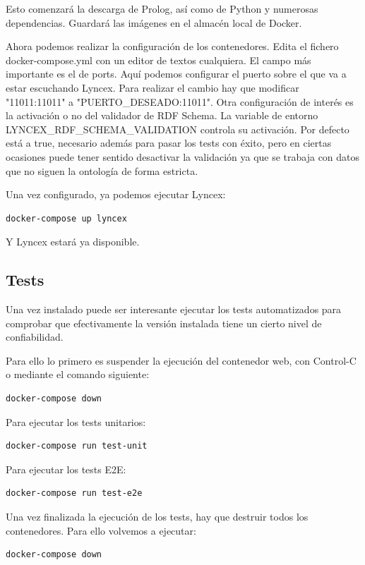 \documentclass[12pt]{report} %
\begin{document}
Esto comenzará la descarga de Prolog, así como de Python y numerosas dependencias. Guardará las imágenes en el almacén local de Docker. 

Ahora podemos realizar la configuración de los contenedores. Edita el fichero docker-compose.yml con un editor de textos cualquiera. El campo más importante es el de ports. Aquí podemos configurar el puerto sobre el que va a estar escuchando Lyncex. Para realizar el cambio hay que modificar "11011:11011" a "PUERTO\_DESEADO:11011". Otra configuración de interés es la activación o no del validador de RDF Schema. La variable de entorno LYNCEX\_RDF\_SCHEMA\_VALIDATION controla su activación. Por defecto está a true, necesario además para pasar los tests con éxito, pero en ciertas ocasiones puede tener sentido desactivar la validación ya que se trabaja con datos que no siguen la ontología de forma estricta.

Una vez configurado, ya podemos ejecutar Lyncex:
\begin{verbatim}
docker-compose up lyncex
\end{verbatim}
Y Lyncex estará ya disponible.

\subsection{Tests}

Una vez instalado puede ser interesante ejecutar los tests automatizados para comprobar que efectivamente la versión instalada tiene un cierto nivel de confiabilidad.

Para ello lo primero es suspender la ejecución del contenedor web, con Control-C o mediante el comando siguiente:
\begin{verbatim}
docker-compose down
\end{verbatim}

Para ejecutar los tests unitarios:
\begin{verbatim}
docker-compose run test-unit
\end{verbatim}

Para ejecutar los tests E2E:
\begin{verbatim}
docker-compose run test-e2e
\end{verbatim}

Una vez finalizada la ejecución de los tests, hay que destruir todos los contenedores. Para ello volvemos a ejecutar:
\begin{verbatim}
docker-compose down
\end{verbatim}
\end{document}
